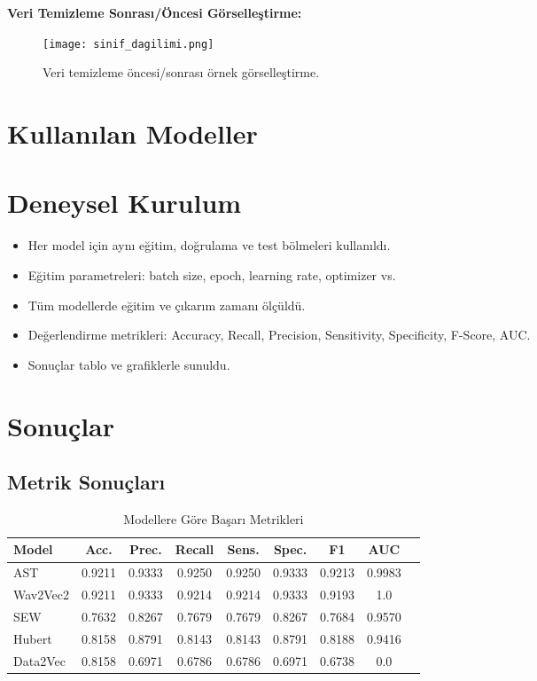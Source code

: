 \documentclass[conference]{IEEEtran}
\begin{document}
\textbf{Veri Temizleme Sonrası/Öncesi Görselleştirme:}
\begin{figure}[h]
    \centering
    \texttt{[image: sinif\_dagilimi.png]}
    \caption{Veri temizleme öncesi/sonrası örnek görselleştirme.}
\end{figure}

\section{Kullanılan Modeller}

\section{Deneysel Kurulum}
\begin{itemize}
    \item Her model için aynı eğitim, doğrulama ve test bölmeleri kullanıldı.
    \item Eğitim parametreleri: batch size, epoch, learning rate, optimizer vs.
    \item Tüm modellerde eğitim ve çıkarım zamanı ölçüldü.
    \item Değerlendirme metrikleri: Accuracy, Recall, Precision, Sensitivity, Specificity, F-Score, AUC.
    \item Sonuçlar tablo ve grafiklerle sunuldu.
\end{itemize}

\section{Sonuçlar}

\subsection{Metrik Sonuçları}

\begin{table}[h]
\centering
\caption{Modellere Göre Başarı Metrikleri}
\begin{tabular}{lcccccccc}
\toprule
Model & Acc. & Prec. & Recall & Sens. & Spec. & F1 & AUC \\
\midrule
AST      & 0.9211 & 0.9333 & 0.9250 & 0.9250 & 0.9333 & 0.9213 & 0.9983  \\
Wav2Vec2 & 0.9211 & 0.9333 & 0.9214 & 0.9214 & 0.9333 & 0.9193 & 1.0  \\
SEW      & 0.7632 & 0.8267 & 0.7679 & 0.7679 & 0.8267 & 0.7684 & 0.9570  \\
Hubert   & 0.8158 & 0.8791 & 0.8143 & 0.8143 & 0.8791 & 0.8188 & 0.9416  \\
Data2Vec & 0.8158 & 0.6971 & 0.6786 & 0.6786 & 0.6971 & 0.6738 & 0.0 \\
\bottomrule
\end{tabular}
\end{table}
\end{document}
